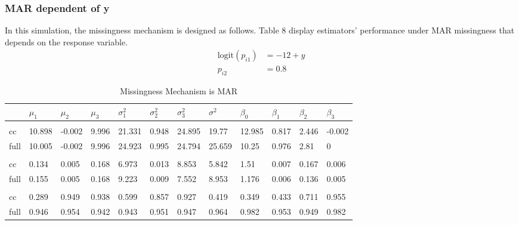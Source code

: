 \documentclass[
  twocolumn]{article}
\begin{document}
\hypertarget{mar-dependent-of-y}{%
\subsubsection{MAR dependent of y}\label{mar-dependent-of-y}}

In this simulation, the missingness mechanism is designed as follows.
Table 8 display estimators' performance under MAR missingness that
depends on the response variable. \[
\begin{aligned}
\mathrm{logit}(p_{i1}) &= -12 + y \\
p_{i2} &= 0.8
\end{aligned}
\]

\begin{table*}[hbp]
\caption{Missingness Mechanism is MAR}
\begingroup\fontsize{7}{9}\selectfont

\begin{tabu} to 
\toprule
 & $\mu_1$ & $\mu_2$ & $\mu_3$ & $\sigma^2_1$ & $\sigma^2_2$ & $\sigma^2_3$ & $\sigma^2$ & $\beta_0$ & $\beta_1$ & $\beta_2$ & $\beta_3$\\
\midrule
\addlinespace[0.3em]
\\
\hspace{1em}cc & 10.898 & -0.002 & 9.996 & 21.331 & 0.948 & 24.895 & 19.77 & 12.985 & 0.817 & 2.446 & -0.002\\
\hspace{1em}full & 10.005 & -0.002 & 9.996 & 24.923 & 0.995 & 24.794 & 25.659 & 10.25 & 0.976 & 2.81 & 0\\
\addlinespace[0.3em]
\\
\hspace{1em}cc & 0.134 & 0.005 & 0.168 & 6.973 & 0.013 & 8.853 & 5.842 & 1.51 & 0.007 & 0.167 & 0.006\\
\hspace{1em}full & 0.155 & 0.005 & 0.168 & 9.223 & 0.009 & 7.552 & 8.953 & 1.176 & 0.006 & 0.136 & 0.005\\
\addlinespace[0.3em]
\\
\hspace{1em}cc & 0.289 & 0.949 & 0.938 & 0.599 & 0.857 & 0.927 & 0.419 & 0.349 & 0.433 & 0.711 & 0.955\\
\hspace{1em}full & 0.946 & 0.954 & 0.942 & 0.943 & 0.951 & 0.947 & 0.964 & 0.982 & 0.953 & 0.949 & 0.982\\
\bottomrule
\end{tabu}
\endgroup{}
\end{table*}
\end{document}
